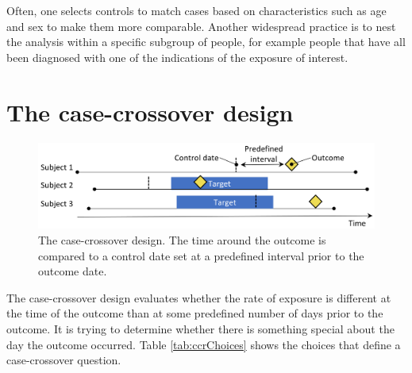 \documentclass[11pt]{book}
\theoremstyle{definition}
\theoremstyle{definition}
\theoremstyle{definition}
\theoremstyle{remark}
\begin{document}
Often, one selects controls to match cases based on characteristics such as age and sex to make them more comparable. Another widespread practice is to nest the analysis within a specific subgroup of people, for example people that have all been diagnosed with one of the indications of the exposure of interest.

\hypertarget{the-case-crossover-design}{%
\section{The case-crossover design}\label{the-case-crossover-design}}


\begin{figure}

{\centering \includegraphics[width=0.9\linewidth]{images/PopulationLevelEstimation/caseCrossover} 

}

\caption{The case-crossover design. The time around the outcome is compared to a control date set at a predefined interval prior to the outcome date.}\label{fig:caseCrossover}
\end{figure}

The case-crossover \citep{maclure_1991} design evaluates whether the rate of exposure is different at the time of the outcome than at some predefined number of days prior to the outcome. It is trying to determine whether there is something special about the day the outcome occurred. Table \ref{tab:ccrChoices} shows the choices that define a case-crossover question.  
\end{document}

